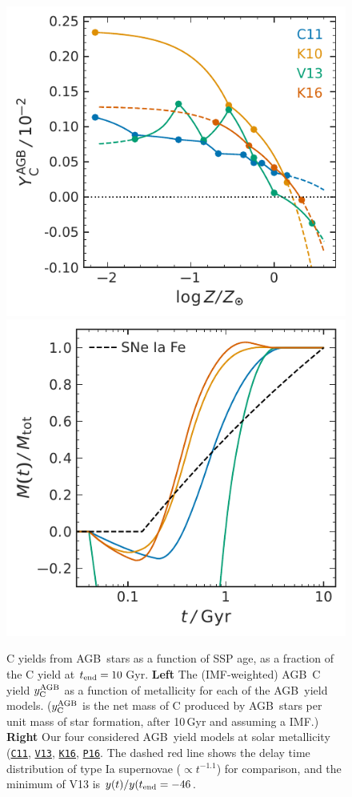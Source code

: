 \documentclass[fleqn,
usenatbib]{mnras}
\newcommand{\cxi}{\texttt{\hyperlink{C11}{C11}}}
\newcommand{\pxvi}{\texttt{\hyperlink{P16}{P16}}}
\newcommand{\kxvi}{\texttt{\hyperlink{K16}{K16}}}
\newcommand{\vxiii}{\texttt{\hyperlink{V13}{V13}}}
\newcommand{\agb}{AGB}
\newcommand{\Ycagb}{\ensuremath{y_{\rm C}^{\rm AGB}}}
\begin{document}
\begin{figure}
    \centering
    \includegraphics{y_agb_vs_z.pdf}
    \includegraphics{y_agb_vs_t.pdf}

    \caption[]{ C yields from \agb\ stars as a function of SSP age, as a fraction of the C yield at $t_{\rm end}=10\,$Gyr. 
\textbf{Left} The (IMF-weighted) \agb\ C yield $\Ycagb$ as a function of metallicity for each of the \agb\ yield models. ($\Ycagb$ is the net mass of C produced by \agb\ stars per unit mass of star formation, after 10\,Gyr and assuming a \citealt{kroupa01} IMF.)
    \textbf{Right} Our four considered \agb\ yield models at solar metallicity (\cxi{}, \vxiii{}, \kxvi{}, \pxvi{}. The dashed red line shows the delay time distribution of type Ia supernovae ($\propto t^{-1.1}$) for comparison, and the minimum of V13 is $y(t)/y(t_{\rm end}=-46$. 
}

    \label{fig:agb-ssp}

\end{figure}
\end{document}
